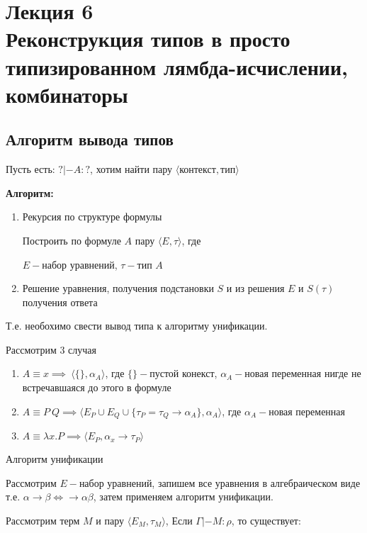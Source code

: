 
		
		\section{Лекция 6 \\ Реконструкция типов в просто типизированном лямбда-исчислении, комбинаторы}
		\subsection{Алгоритм вывода типов}
			Пусть есть: $?|-A:?$, хотим найти пару $\big \langle \text{контекст}, \text{тип} \big \rangle$\par
	\textbf{Алгоритм:}
	\begin{enumerate}
		\item Рекурсия по структуре формулы\par Построить по формуле $A$ пару $\big \langle E, \tau\big \rangle$, где\par $E-$набор уравнений, $\tau-$тип $A$
		\item Решение уравнения, получения подстановки $S$ и из решения $E$ и $S(\tau)$ получения ответа	
	\end{enumerate}
		Т.е. необохимо свести вывод типа к алгоритму унификации.\par
		\begin{oun_paragraph}Рассмотрим 3 случая\end{oun_paragraph}
			\begin{enumerate}
				\item $A\equiv x\implies\:\big \langle \{\}, \alpha_A\big\rangle$, где $\{\}-$пустой конекст, $\alpha_A-$новая переменная нигде не встречавшаяся до этого в формуле
				\item $A\equiv P\:Q\implies\big \langle E_P\cup E_Q\cup \{\tau_P=\tau_Q\rightarrow\alpha_A\}, \alpha_A\big \rangle$, где $\alpha_A-$новая переменная
				\item $A\equiv\lambda x.P\implies\big\langle E_P,\alpha_x\rightarrow\tau_P\big\rangle$
			\end{enumerate}
		\begin{oun_paragraph}Алгоритм унификации\end{oun_paragraph} 
			Рассмотрим $E-$набор уравнений, запишем все уравнения в алгебраическом виде т.е. $\alpha\rightarrow\beta\Leftrightarrow\rightarrow\alpha\beta$, затем применяем алгоритм унификации.
	\begin{lemma}
	Рассмотрим терм $M$ и пару $\big\langle E_M, \tau_M\big\rangle$, Если $\Gamma|-M:\rho$, то существует:
	\end{lemma}	
